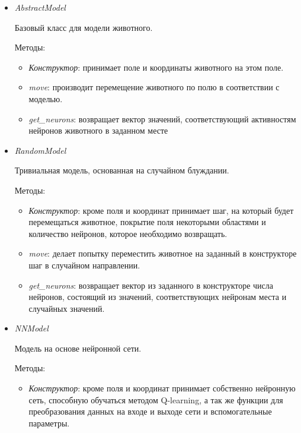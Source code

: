 \documentclass{article}
\begin{document}
\begin{itemize}
    \item \textit{AbstractModel}

    Базовый класс для модели животного.

    Методы:
    \begin{itemize}
        \item \textit{Конструктор}: принимает поле и координаты животного на этом поле.

        \item \textit{move}: производит перемещение животного по полю в соответствии с моделью.

        \item \textit{get\_neurons}: возвращает вектор значений, соответствующий активностям нейронов
        животного в заданном месте
    \end{itemize}

    \item \textit{RandomModel}

    Тривиальная модель, основанная на случайном блуждании.

    Методы:

    \begin{itemize}
        \item \textit{Конструктор}: кроме поля и координат принимает шаг, на который будет перемещаться
животное, покрытие поля некоторыми областями и количество нейронов, которое необходимо
возвращать.

    \item \textit{move}: делает попытку переместить животное на заданный в конструкторе шаг в
случайном направлении.

    \item \textit{get\_neurons}: возвращает вектор из заданного в конструкторе числа нейронов, состоящий
из значений, соответствующих нейронам места и случайных значений.
    \end{itemize}

    \item \textit{NNModel}

    Модель на основе нейронной сети.

    Методы:

    \begin{itemize}
        \item \textit{Конструктор}: кроме поля и координат принимает собственно нейронную сеть,
способную обучаться методом Q-learning, а так же функции для преобразования данных на входе
и выходе сети и вспомогательные параметры.


\end{itemize}
\end{itemize}
\end{document}
